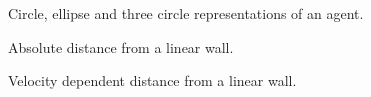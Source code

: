 \documentclass[]{article}
\begin{document}
\tableofcontents
\newpage
    



\begin{figure}[H]
\centering
\begin{tikzpicture}


\end{tikzpicture}
\caption{Circle, ellipse and three circle representations of an agent.}
\end{figure}

\newpage

\begin{multicols*}{2}

\end{multicols*}


\newpage


\begin{figure}[H]
\centering
\begin{tikzpicture}


\end{tikzpicture}
\caption{Absolute distance from a linear wall.}
\end{figure}

\begin{figure}[H]
\centering
\begin{tikzpicture}


\end{tikzpicture}
\caption{Velocity dependent distance from a linear wall.}
\end{figure}


\begin{multicols*}{2}

\end{multicols*}

\newpage


\begin{multicols*}{2}



\end{multicols*}

\begin{multicols*}{2}

\end{multicols*}

\begin{multicols*}{2}

\end{multicols*}

\end{document}
